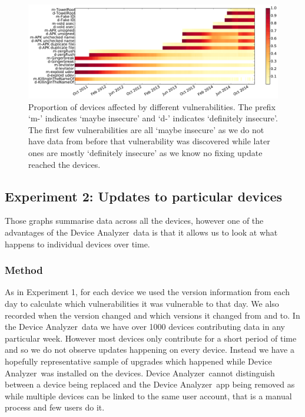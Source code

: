 \documentclass[conference,a4paper,twoside]{IEEEtran}
\newcommand{\da}{Device Analyzer}
\begin{document}
\begin{figure}
 \includegraphics[width=\textwidth]{figures/nvulnerabilities_heat.pdf}
 \caption{Proportion of devices affected by different vulnerabilities. The prefix `m-' indicates `maybe insecure' and `d-' indicates `definitely insecure'. The first few vulnerabilities are all `maybe insecure' as we do not have data from before that vulnerability was discovered while later ones are mostly `definitely insecure' as we know no fixing update reached the devices.}
 \label{fig:nvulnerabilities_heat}
\end{figure}


\subsection{Experiment 2: Updates to particular devices}\label{sec:exp:device_updates}
Those graphs summarise data across all the devices, however one of the advantages of the \da\ data is that it allows us to look at what happens to individual devices over time.

\subsubsection{Method}
As in Experiment 1, for each device we used the version information from each day to calculate which vulnerabilities it was vulnerable to that day.
We also recorded when the version changed and which versions it changed from and to.
In the \da\ data we have over 1000 devices contributing data in any particular week.
However most devices only contribute for a short period of time and so we do not observe updates happening on every device.
Instead we have a hopefully representative sample of upgrades which happened while \da\ was installed on the devices.
\da\ cannot distinguish between a device being replaced and the \da\ app being removed as while multiple devices can be linked to the same user account, that is a manual process and few users do it.
\end{document}
